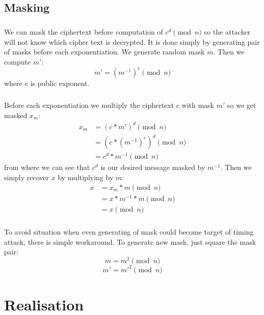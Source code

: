 \documentclass[thesis=B,english]{FITthesis}[2012/10/20]
\begin{document}
\section{Masking}
\paragraph*{}{
We can mask the ciphertext before computation of \(c^d \pmod{n}\) so the attacker will not know which cipher text is decrypted. It is done simply by generating pair of masks 
before each exponentiation. We generate random mask \(m\). Then we compute \(m'\):
\[ m' = (m^{-1})^e \pmod{n}\]
where \(e\) is public exponent.
}
\paragraph*{}
{Before each exponentiation we multiply the ciphertext \(c\) with mask \(m'\) so we get masked \(x_m\):
\begin{equation}
\begin{split}
 x_m & = (c*m')^d \pmod{n} \\
 & = (c * (m^{-1})^e)^d \pmod{n}  \\
 & = c^d * m^{-1} \pmod{n}
\end{split}
\end{equation}
from where we can see that \(c^d\) is our desired message masked by \(m^{-1}\). Then we simply recover \(x\) by multiplying by \(m\)\cite{Kocher1996}:
\begin{equation}
\begin{split}
 x & = x_m * m \pmod{n} \\
 & = x * m^{-1} * m \pmod{n}  \\
 & = x \pmod{n}
\end{split}
\end{equation}
}

\paragraph*{}{
To avoid situation when even generating of mask could become target of timing attack, there is simple workaround. To generate new mask, just square the mask pair:\cite{Kocher1996}
\[m = m^2 \pmod{n}\]
\[m' = m'^2 \pmod{n}\]

}

\chapter{Realisation}
\end{document}
